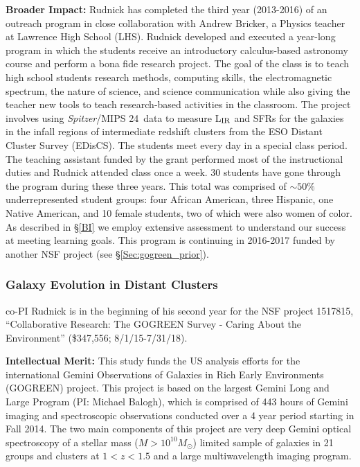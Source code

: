 \documentclass[11pt, preprint]{aastex}
\begin{document}
{\textbf{Broader Impact:} Rudnick has completed the third year
(2013-2016) of an outreach program in close collaboration with Andrew
Bricker, a Physics teacher at Lawrence High School (LHS). Rudnick
developed and executed a year-long program in which the students
receive an introductory calculus-based astronomy course and perform a
bona fide research project. The goal of the class is to teach high
school students research methods, computing skills, the
electromagnetic spectrum, the nature of science, and science
communication while also giving the teacher new tools to teach
research-based activities in the classroom.  The project involves
using \textit{Spitzer}/MIPS 24\micron\ data to measure L$_{\rm IR}$
and SFRs for the galaxies in the infall regions of intermediate
redshift clusters from the ESO Distant Cluster Survey (EDisCS). The
students meet every day in a special class period. The teaching
assistant funded by the grant performed most of the instructional
duties and Rudnick attended class once a week.  30 students have gone
through the program during these three years.  This total was
comprised of $\sim 50\%$ underrepresented student groups: four African
American, three Hispanic, one Native American, and 10 female students,
two of which were also women of color.  As described in \S\ref{BI} we
employ extensive assessment to understand our success at meeting
learning goals.  This program is continuing in 2016-2017 funded by
another NSF project (see \S\ref{Sec:gogreen_prior}).

\vspace*{-.7cm}
\subsubsection{Galaxy Evolution in Distant Clusters}
\vspace*{-.4cm}
\label{Sec:gogreen_prior}

co-PI Rudnick is in the beginning of his second year for the NSF
project 1517815, ``Collaborative Research: The GOGREEN Survey - Caring
About the Environment'' (\$347,556; 8/1/15-7/31/18).

\textbf{Intellectual Merit:} This study funds the US analysis efforts
for the international Gemini Observations of Galaxies in Rich Early
Environments (GOGREEN) project.  This project is based on the largest
Gemini Long and Large Program (PI: Michael Balogh), which is comprised
of 443 hours of Gemini imaging and spectroscopic observations
conducted over a 4 year period starting in Fall 2014.  The two main
components of this project are very deep Gemini optical spectroscopy
of a stellar mass ($M>10^{10}M_\odot$) limited sample of galaxies in
21 groups and clusters at $1<z<1.5$ and a large multiwavelength
imaging program. 

}
\end{document}
